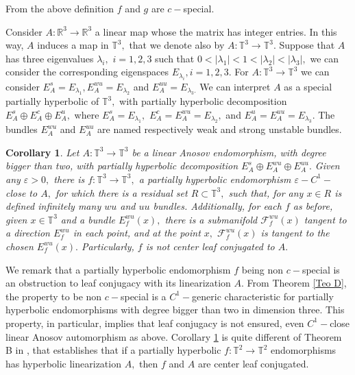 \documentclass[12pt,reqno]{amsart}
\numberwithin{equation}{section}
\theoremstyle{plain}
\newtheorem{corollary}[theorem]{Corollary}
\theoremstyle{remark}
\begin{document}
From the above definition $f$ and $g$ are $c-$special.


Consider $A: \mathbb{R}^3 \rightarrow \mathbb{R}^3 $ a linear map whose the matrix has integer entries. In this way, $A$ induces a map in $\mathbb{T}^3,$ that we denote also by $A:\mathbb{T}^3 \rightarrow \mathbb{T}^3 .$ Suppose that $A$ has three \mbox{eigenvalues} $\lambda_i,$ $ i =1,2,3$ such that $0 < |\lambda_1| < 1 < |\lambda_2| < |\lambda_3|,$ we can consider the corresponding eigenspaces $E_{\lambda_i}, i=1,2,3.$ For $A:\mathbb{T}^3 \rightarrow \mathbb{T}^3 $ we can consider $E^s_A = E_{\lambda_1}, E^{wu}_A = E_{\lambda_2}$ and $E^{uu}_A = E_{\lambda_3.}$ We can interpret $A$ as a special partially hyperbolic of $\mathbb{T}^3,$ with partially hyperbolic decomposition $E^s_A \oplus E^c_A \oplus E^u_A,$ where $ E^s_A = E_{\lambda_1},$ \mbox{$ E^c_A = E^{wu}_A = E_{\lambda_2},$} and $ E^u_A = E^{uu}_A = E_{\lambda_3}. $ The bundles $E^{wu}_A$ and $E^{uu}_A$ are named respectively weak and strong unstable bundles.

\begin{corollary}\label{Teo B}
 Let $A: \mathbb{T}^3 \rightarrow \mathbb{T}^3  $ be a linear Anosov endomorphism, with degree bigger than two, with partially hyperbolic decomposition
 $E^s_A \oplus E^{wu}_A \oplus E^{uu}_A.$ Given any $\varepsilon > 0,$ there is $f: \mathbb{T}^3 \rightarrow \mathbb{T}^3,$ a partially hyperbolic endomorphism $\varepsilon-C^1-$close to $A,$ for which there is a residual set $R \subset \mathbb{T}^3,$ such that, for any $x \in R$ is defined infinitely many $wu$ and $uu$ bundles.  Additionally, for each $f$ as before,  given $x \in \mathbb{T}^3$ and a bundle $E^{wu}_f(x),$ there is a submanifold $\mathcal{F}^{wu}_f(x)$ tangent to a direction $E^{wu}_f$ in each point, and at the point $x,$ $\mathcal{F}^{wu}_f(x)$ is tangent to the chosen $E^{wu}_f(x).$  Particularly, $f$ is not center leaf conjugated to $A.$
\end{corollary}


We remark that a  partially hyperbolic endomorphism $f$ being non $c-$special is an obstruction to leaf conjugacy with its linearization $A.$  From Theorem \ref{Teo D}, the property to be non $c-$special is a $C^1-$generic characteristic for partially hyperbolic endomorphisms with degree bigger than two in dimension three. This property, in particular, implies that leaf conjugacy is not ensured, even $C^1-$close linear Anosov automorphism as above. Corollary \ref{Teo B} is quite different of Theorem B in \cite{HH21}, that establishes that if a   partially hyperbolic $f: \mathbb{T}^2 \rightarrow \mathbb{T}^2 $ endomorphisms has hyperbolic linearization $A,$  then $f$ and $A$ are center leaf conjugated.
\end{document}
